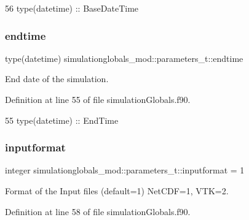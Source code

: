 \begin{DoxyCode}
56         \textcolor{keywordtype}{type}(datetime)  :: BaseDateTime
\end{DoxyCode}
\mbox{\label{structsimulationglobals__mod_1_1parameters__t_a2fcf43eac4c8f57debf9f35d90a121f6}} 
\subsubsection{\texorpdfstring{endtime}{endtime}}
{\footnotesize\ttfamily type(datetime) simulationglobals\+\_\+mod\+::parameters\+\_\+t\+::endtime\hspace{0.3cm}{\ttfamily [private]}}



End date of the simulation. 



Definition at line 55 of file simulation\+Globals.\+f90.


\begin{DoxyCode}
55         \textcolor{keywordtype}{type}(datetime)  :: EndTime
\end{DoxyCode}
\mbox{\label{structsimulationglobals__mod_1_1parameters__t_af0d2d59bffc7e5b03b30c6a3ff038a83}} 
\subsubsection{\texorpdfstring{inputformat}{inputformat}}
{\footnotesize\ttfamily integer simulationglobals\+\_\+mod\+::parameters\+\_\+t\+::inputformat = 1\hspace{0.3cm}{\ttfamily [private]}}



Format of the Input files (default=1) Net\+C\+DF=1, V\+TK=2. 



Definition at line 58 of file simulation\+Globals.\+f90.


